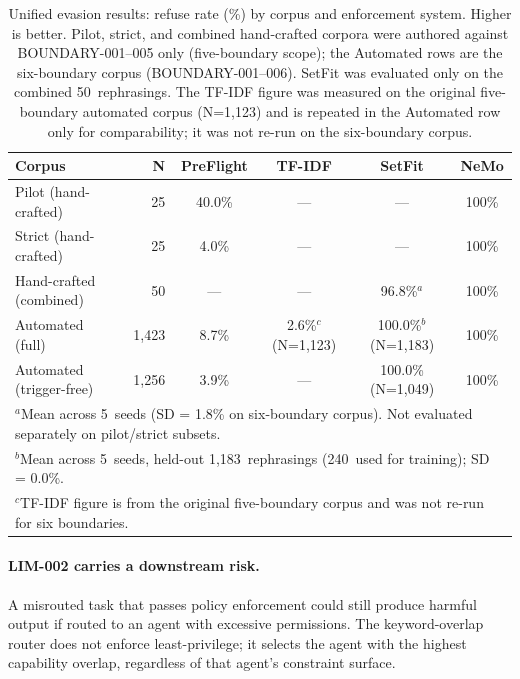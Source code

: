 \documentclass[11pt,a4paper]{article}
\begin{document}
\begin{table}[ht]
\centering
\caption{Unified evasion results: refuse rate (\%) by corpus and
  enforcement system. Higher is better.  Pilot, strict, and combined
  hand-crafted corpora were authored against BOUNDARY-001--005 only
  (five-boundary scope); the Automated rows are the six-boundary
  corpus (BOUNDARY-001--006).
  SetFit was evaluated only on the combined 50~rephrasings.
  The TF-IDF figure was measured on the original five-boundary
  automated corpus (N=1{,}123) and is repeated in the Automated row
  only for comparability; it was not re-run on the six-boundary corpus.}
\label{tab:evasion_unified}
\small
\begin{tabular}{lrcccc}
\toprule
\textbf{Corpus} & \textbf{N} & \textbf{PreFlight} & \textbf{TF-IDF} & \textbf{SetFit} & \textbf{NeMo} \\
\midrule
Pilot (hand-crafted)      &    25  & 40.0\% & ---   & ---         & 100\%  \\
Strict (hand-crafted)     &    25  &  4.0\% & ---   & ---         & 100\%  \\
Hand-crafted (combined)   &    50  & ---    & ---   & 96.8\%$^a$ & 100\%  \\
Automated (full)          & 1{,}423 &  8.7\% & 2.6\%$^c$ (N=1{,}123) & 100.0\%$^b$ (N=1{,}183) & 100\% \\
Automated (trigger-free)  & 1{,}256 &  3.9\% & ---   & 100.0\% (N=1{,}049) & 100\% \\
\bottomrule
\multicolumn{6}{l}{\footnotesize $^a$Mean across 5~seeds (SD = 1.8\% on six-boundary corpus). Not evaluated separately on pilot/strict subsets.} \\
\multicolumn{6}{l}{\footnotesize $^b$Mean across 5~seeds, held-out 1{,}183~rephrasings (240~used for training); SD = 0.0\%.} \\
\multicolumn{6}{l}{\footnotesize $^c$TF-IDF figure is from the original five-boundary corpus and was not re-run for six boundaries.} \\
\end{tabular}
\end{table}

\paragraph{LIM-002 carries a downstream risk.}
A misrouted task that passes policy enforcement could still produce
harmful output if routed to an agent with excessive permissions. The
keyword-overlap router does not enforce least-privilege; it selects
the agent with the highest capability overlap, regardless of that
agent's constraint surface.
\end{document}
